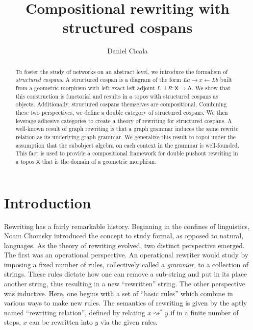 \documentclass{amsart}
\author{Daniel Cicala}
\title{Compositional rewriting with structured cospans}
\newcommand{\A}{\cat{A}}
\newcommand{\X}{\cat{X}}
\newcommand{\cat}[1]{\mathsf{#1}}
\newcommand{\from}{\colon}
\newcommand{\deriv}[2]{#1 \rightsquigarrow^\ast #2}
\renewcommand{\gets}{\leftarrow}
\theoremstyle{remark}
\theoremstyle{definition}
\begin{document}
\maketitle{}

\begin{abstract}
  To foster the study of networks on an abstract level, we introduce
  the formalism of \emph{structured cospans}. A structured cospan is a
  diagram of the form $ La \to x \gets Lb $ built from a geometric
  morphism with left exact left adjoint
  $ L \dashv R \from \X \to \A $.  We show that this construction is
  functorial and results in a topos with structured cospans as objects.
  Additionally, structured cospans themselves are
  compositional. Combining these two perspectives, we define a double
  category of structured cospans.  We then leverage adhesive
  categories to create a theory of rewriting for structured cospans. A
  well-known result of graph rewriting is that a graph grammar induces
  the same rewrite relation as its underlying graph grammar. We
  generalize this result to topoi under the assumption that the
  subobject algebra on each context in the grammar is well-founded.
  This fact is used to provide a compositional framework for double
  pushout rewriting in a topos $ \X $ that is the domain of a
  geometric morphism.  
\end{abstract}


\section{Introduction}
\label{sec:Introduction}

Rewriting has a fairly remarkable history. Beginning in the confines
of linguistics, Noam Chomsky \cite{Chomsky} introduced the concept to
study formal, as opposed to natural, languages. As the theory of
rewriting evolved, two distinct perspective emerged. The first was an
operational perspective. An operational rewriter would study by
imposing a fixed number of rules, collectively called a
\emph{grammar}, to a collection of strings. These rules dictate how
one can remove a sub-string and put in its place another string, thus
resulting in a new ``rewritten'' string.  The other perspective was
inductive.  Here, one begins with a set of ``basic rules'' which
combine in various ways to make new rules. The semantics of rewriting
is given by the aptly named ``rewriting relation'', defined by
relating $ \deriv{x}{y} $ if in a finite number of steps, $ x $ can be
rewritten into $ y $ via the given rules.
\end{document}
